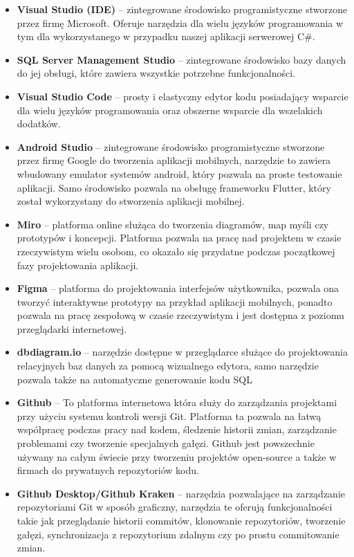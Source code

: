 \documentclass[a4paper,twoside,12pt]{book}
\begin{document}
\begin{itemize}
    \item \textbf{Visual Studio (IDE)} -- zintegrowane środowisko programistyczne stworzone przez firmę Microsoft. Oferuje narzędzia dla wielu języków programowania w tym dla wykorzystanego w przypadku naszej aplikacji serwerowej C\#.
    \item \textbf{SQL Server Management Studio} -- zintegrowane środowisko bazy danych do jej obsługi, które zawiera wszystkie potrzebne funkcjonalności. 
    \item \textbf{Visual Studio Code} -- prosty i elastyczny edytor kodu posiadający wsparcie dla wielu języków programowania oraz obszerne wsparcie dla wszelakich dodatków.
    \item \textbf{Android Studio} -- zintegrowane środowisko programistyczne stworzone przez firmę Google do tworzenia aplikacji mobilnych, narzędzie to zawiera wbudowany emulator systemów android, który pozwala na proste testowanie aplikacji. Samo środowisko pozwala na obsługę frameworku Flutter, który został wykorzystany do stworzenia aplikacji mobilnej.
    \item \textbf{Miro} -- platforma online służąca do tworzenia diagramów, map myśli czy prototypów i koncepcji. Platforma pozwala na pracę nad projektem w czasie rzeczywistym wielu osobom, co okazało się przydatne podczas początkowej fazy projektowania aplikacji.
    \item \textbf{Figma} -- platforma do projektowania interfejsów użytkownika, pozwala ona tworzyć interaktywne prototypy na przykład aplikacji mobilnych, ponadto pozwala na pracę zespołową w czasie rzeczywistym i jest dostępna z poziomu przeglądarki internetowej.
    \item \textbf{dbdiagram.io} -- narzędzie dostępne w przeglądarce służące do projektowania relacyjnych baz danych za pomocą wizualnego edytora, samo narzędzie pozwala także na automatyczne generowanie kodu SQL
    \item \textbf{Github} -- To platforma internetowa która służy do zarządzania projektami przy użyciu systemu kontroli wersji Git. Platforma ta pozwala na łatwą współpracę podczas pracy nad kodem, śledzenie historii zmian, zarządzanie problemami czy tworzenie specjalnych gałęzi. Github jest powszechnie używany na całym świecie przy tworzeniu projektów open-source a także w firmach do prywatnych repozytoriów kodu.
    \item \textbf{Github Desktop/Github Kraken} -- narzędzia pozwalające na zarządzanie repozytoriami Git w sposób graficzny, narzędzia te oferują funkcjonalności takie jak przeglądanie historii commitów, klonowanie repozytoriów, tworzenie gałęzi, synchronizacja z repozytorium zdalnym czy po prostu commitowanie zmian.

\end{itemize}
\end{document}
